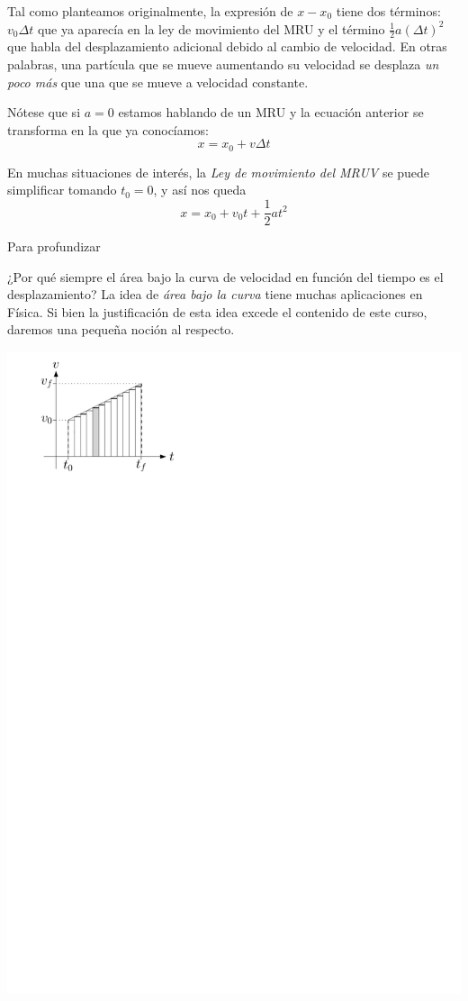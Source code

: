 Tal como planteamos originalmente, la expresión de $x-x_0$ tiene dos términos: $v_0\Delta t$ que ya aparecía en la ley de movimiento del MRU y el término $\frac{1}{2}a(\Delta t)^2$ que habla del desplazamiento adicional debido al cambio de velocidad. En otras palabras, una partícula que se mueve aumentando su velocidad se desplaza \textit{un poco más} que una que se mueve a velocidad constante.

Nótese que si $a=0$ estamos hablando de un MRU y la ecuación anterior se transforma en la que ya conocíamos:
$$x=x_0+v\Delta t$$

En muchas situaciones de interés, la \textit{Ley de movimiento del MRUV} se puede simplificar tomando $t_0=0$, y así nos queda $$x=x_0+v_0t+\frac{1}{2}at^2$$

\begin{mybox}{Para profundizar}

¿Por qué siempre el área bajo la curva de velocidad en función del tiempo es el desplazamiento? La idea de \textit{área bajo la curva} tiene muchas aplicaciones en Física. Si bien la justificación de esta idea excede el contenido de este curso, daremos una pequeña noción al respecto.

\begin{center}
\centering
\includegraphics[scale=0.8]{img/integral.pdf}
\end{center}


\end{mybox}
